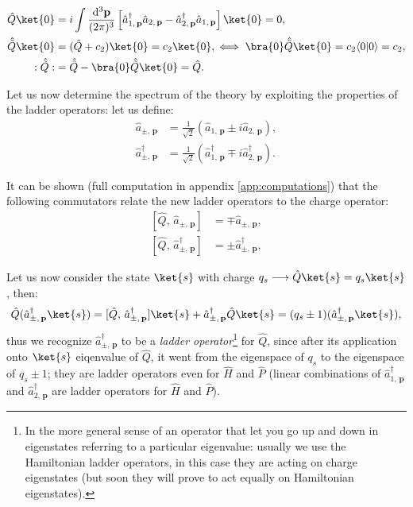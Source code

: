 \[
    \begin{aligned}
        \hat{Q}\ket{0}         & = i \int \frac{\mathrm{d}^3 \mathbf{p}}{(2\pi)^3} \left[ \hat{a}^{\dagger}_{1,\,\mathbf{p}} \hat{a}_{2,\,\mathbf{p}} - \hat{a}^{\dagger}_{2,\,\mathbf{p}} \hat{a}_{1,\,\mathbf{p}} \right] \ket{0} = 0, \\
        \hat{\tilde{Q}}\ket{0} & = (\hat{Q} + c_2) \ket{0} = c_2 \ket{0}, \iff \bra{0}\hat{\tilde{Q}} \ket{0} = c_2 \langle 0|0 \rangle = c_2,                                                                                           \\
        :\hat{\tilde{Q}}:      & = \hat{\tilde{Q}} - \bra{0}\hat{\tilde{Q}} \ket{0} = \hat{Q}.
    \end{aligned}
\]

Let us now determine the spectrum of the theory by exploiting the properties of the ladder operators: let us define:
\[
    \begin{aligned}
        \hat{a}_{\pm,\,\mathbf{p}}           & = \frac{1}{\sqrt{2}} \left( \hat{a}_{1,\,\mathbf{p}} \pm i \hat{a}_{2,\,\mathbf{p}} \right),                     \\
        \hat{a}_{\pm,\,\mathbf{p}}^{\dagger} & = \frac{1}{\sqrt{2}} \left( \hat{a}_{1,\,\mathbf{p}}^{\dagger} \mp i \hat{a}_{2,\,\mathbf{p}}^{\dagger} \right).
    \end{aligned}
\]

It can be shown (full computation in appendix \ref{app:computations}) that the following commutators relate the new ladder operators to the charge operator:
\[
    \begin{aligned}
        [\hat{Q},\, \hat{a}_{\pm,\,\mathbf{p}}]           & = \mp \hat{a}_{\pm,\,\mathbf{p}},           \\
        [\hat{Q},\, \hat{a}_{\pm,\,\mathbf{p}}^{\dagger}] & = \pm \hat{a}_{\pm,\,\mathbf{p}}^{\dagger},
    \end{aligned}
\]

Let us now consider the state \(\ket{s}\) with charge \(q_s \longrightarrow \hat{Q}\ket{s} = q_s \ket{s}\), then:
\[
    \hat{Q}(\hat{a}_{\pm,\,\mathbf{p}}^{\dagger}\ket{s}) = [\hat{Q},\, \hat{a}_{\pm,\,\mathbf{p}}^{\dagger}] \ket{s} + \hat{a}_{\pm,\,\mathbf{p}}^{\dagger} \hat{Q} \ket{s} = (q_s \pm 1) (\hat{a}_{\pm,\,\mathbf{p}}^{\dagger}\ket{s}),
\]
thus we recognize \(\hat{a}_{\pm,\,\mathbf{p}}^{\dagger}\) to be a \textit{ladder operator}\footnote{In the more general sense of an operator that let you go up and down in eigenstates referring to a particular eigenvalue: usually we use the Hamiltonian ladder operators, in this case they are acting on charge eigenstates (but soon they will prove to act equally on Hamiltonian eigenstates).} for \(\hat{Q}\), since after its application onto \(\ket{s}\) eiqenvalue of \(\hat{Q}\), it went from the eigenspace of \(q_s\) to the eigenspace of \(q_s \pm 1\); they are ladder operators even for \(\hat{H}\) and \(\hat{P}\) (linear combinations of \(\hat{a}_{1,\,\mathbf{p}}^{\dagger}\) and \(\hat{a}_{2,\,\mathbf{p}}^{\dagger}\) are ladder operators for \(\hat{H}\) and \(\hat{P}\)).

